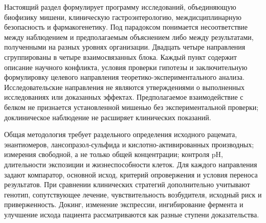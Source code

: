 \documentclass[11pt,a4paper,notitlepage]{report}
\begin{document}
Настоящий раздел формулирует программу исследований, объединяющую биофизику мишени, клиническую гастроэнтерологию, междисциплинарную безопасность и фармакогенетику. Под парадоксом понимается несоответствие между наблюдением и предполагаемым объяснением либо между результатами, полученными на разных уровнях организации. Двадцать четыре направления сгруппированы в четыре взаимосвязанных блока. Каждый пункт содержит описание научного конфликта, условия проверки гипотезы и заключительную формулировку целевого направления теоретико-экспериментального анализа. Исследовательские направления не являются утверждениями о выполненных исследованиях или доказанных эффектах. Предполагаемое взаимодействие с белком не признается установленной мишенью без экспериментальной проверки; доклиническое наблюдение не расширяет клинических показаний.

Общая методология требует раздельного определения исходного рацемата, энантиомеров, лансопразол-сульфида и кислотно-активированных производных; измерения свободной, а не только общей концентрации; контроля pH, длительности экспозиции и жизнеспособности клеток. Для каждого направления задают компаратор, основной исход, критерий опровержения и условия переноса результатов. При сравнении клинических стратегий дополнительно учитывают генотип, сопутствующее лечение, чувствительность возбудителя, исходный риск и приверженность. Докинг, изменение экспрессии, ингибирование фермента и улучшение исхода пациента рассматриваются как разные ступени доказательства.
\end{document}
